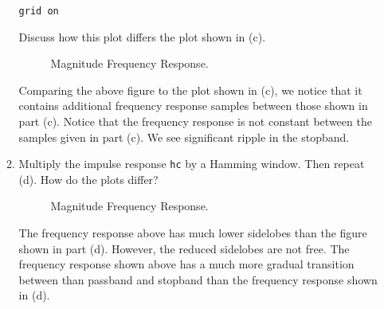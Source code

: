 \documentclass[fleqn]{article}
\begin{document}
\begin{enumerate}
\begin{enumerate}[nolistsep]
			\texttt{grid on}
			
			Discuss how this plot differs the plot shown in (c).
			
			\begin{figure}[H]
				\centerline{}
				\caption{Magnitude Frequency Response.}
			\end{figure}
			
			Comparing the above figure to the plot shown in (c), we notice that it contains additional frequency response samples between those shown in part (c). Notice that the frequency response is not constant between the samples given in part (c). We see significant ripple in the stopband.
			
			\item Multiply the impulse response \texttt{hc} by a Hamming window. Then repeat (d). How do the plots differ?
			
			\begin{figure}[H]
				\centerline{}
				\caption{Magnitude Frequency Response.}
			\end{figure}
			
			The frequency response above has much lower sidelobes than the figure shown in part (d). However, the reduced sidelobes are not free. The frequency response shown above has a much more gradual transition between than passband and stopband than the frequency response shown in (d).
			

\end{enumerate}
\end{enumerate}
\end{document}
